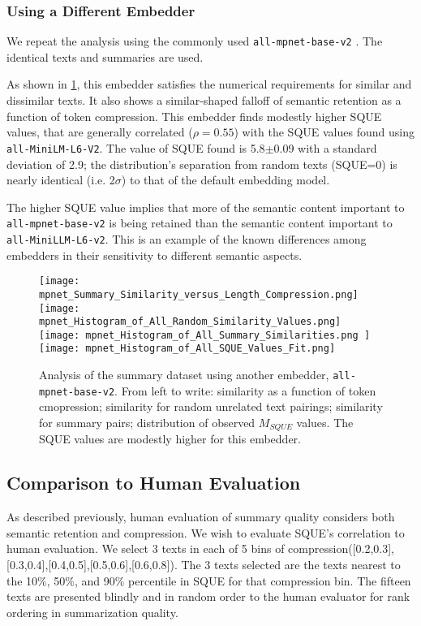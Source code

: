 \documentclass{article}
\begin{document}
{\subsubsection{Using a Different Embedder}

We repeat the analysis using the commonly 
used \texttt{all-mpnet-base-v2}  
\citet{mpnet}.
The identical texts and summaries are used.

As shown in \ref{fig:mpnet}, this embedder satisfies the numerical requirements for similar and dissimilar texts.
It also shows a similar-shaped falloff of semantic retention as a function of token compression.
This embedder finds modestly higher SQUE values, that are generally correlated ($\rho=0.55$) with the SQUE values found using \texttt{all-MiniLM-L6-V2}.
The value of SQUE found is 5.8$\pm$0.09 with a standard deviation of 2.9;
the distribution's separation from random texts (SQUE=0) is nearly identical (i.e. 2$\sigma$) to that of the default embedding model.

The higher SQUE value implies that more of the semantic content important to \texttt{all-mpnet-base-v2} is being retained than the semantic content important to \texttt{all-MiniLLM-L6-v2}.  
This is an example of the known differences among embedders in their sensitivity to different semantic aspects.

\begin{figure}
	\centering
	\texttt{[image: mpnet\_Summary\_Similarity\_versus\_Length\_Compression.png]}
	\texttt{[image: mpnet\_Histogram\_of\_All\_Random\_Similarity\_Values.png]}
	\texttt{[image: mpnet\_Histogram\_of\_All\_Summary\_Similarities.png ]}
	\texttt{[image: mpnet\_Histogram\_of\_All\_SQUE\_Values\_Fit.png]}
	\caption{Analysis of the summary dataset using another embedder, \texttt{all-mpnet-base-v2}.  From left to write: similarity as a function of token cmopression; similarity for random unrelated text pairings; similarity for summary pairs; distribution of observed $M_{SQUE}$ values.  The SQUE values are modestly higher for this embedder.}
	\label{fig:mpnet}
\end{figure}


\subsection{Comparison to Human Evaluation}

As described previously, human evaluation of summary quality considers both semantic retention and compression.  
We wish to evaluate SQUE's correlation to human evaluation.  
We select 3 texts in each of 5 bins of compression([0.2,0.3],[0.3,0.4],[0.4,0.5],[0.5,0.6],[0.6,0.8]).  
The 3 texts selected  are the texts nearest to the 10\%, 50\%, and 90\% percentile
in SQUE for that compression bin.
The fifteen texts are presented blindly and in random order to the human evaluator for rank ordering in summarization quality.

}
\end{document}
